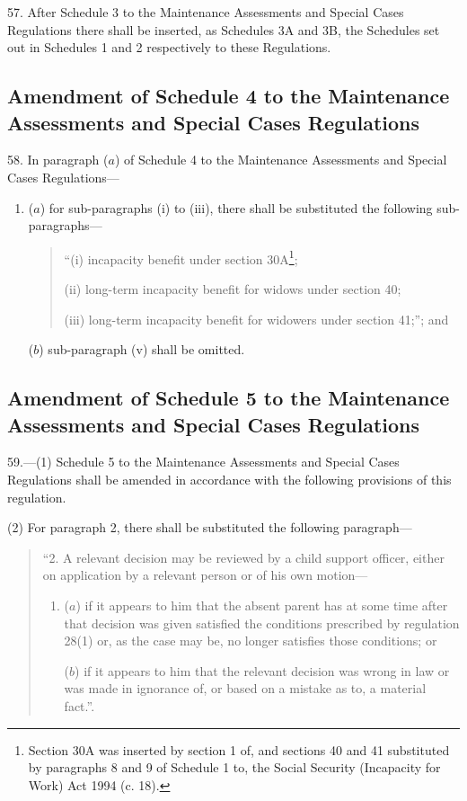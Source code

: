 \documentclass[a4paper]{article}
\begin{document}
57.  After Schedule 3 to the Maintenance Assessments and Special Cases Regulations there shall be inserted, as Schedules 3A and 3B, the Schedules set out in Schedules 1 and 2 respectively to these Regulations.

\subsection[58. Amendment of Schedule 4 to the Maintenance Assessments and Special Cases Regulations]{Amendment of Schedule 4 to the Maintenance Assessments and Special Cases Regulations}

58.  In paragraph ($a$) of Schedule 4 to the Maintenance Assessments and Special Cases Regulations—
\begin{enumerate}\item[]
($a$) for sub-paragraphs (i) to (iii), there shall be substituted the following sub-paragraphs—
\begin{quotation}
“(i) incapacity benefit under section 30A\footnote{\frenchspacing Section 30A was inserted by section 1 of, and sections 40 and 41 substituted by paragraphs 8 and 9 of Schedule 1 to, the Social Security (Incapacity for Work) Act 1994 (c. 18).};

(ii) long-term incapacity benefit for widows under section 40;

(iii) long-term incapacity benefit for widowers under section 41;”; and
\end{quotation}

($b$) sub-paragraph (v) shall be omitted.
\end{enumerate}

\subsection[59. Amendment of Schedule 5 to the Maintenance Assessments and Special Cases Regulations]{Amendment of Schedule 5 to the Maintenance Assessments and Special Cases Regulations}

59.—(1) Schedule 5 to the Maintenance Assessments and Special Cases Regulations shall be amended in accordance with the following provisions of this regulation.

(2) For paragraph 2, there shall be substituted the following paragraph—
\begin{quotation}
“2.  A relevant decision may be reviewed by a child support officer, either on application by a relevant person or of his own motion—
\begin{enumerate}\item[]
($a$) if it appears to him that the absent parent has at some time after that decision was given satisfied the conditions prescribed by regulation 28(1) or, as the case may be, no longer satisfies those conditions; or

($b$) if it appears to him that the relevant decision was wrong in law or was made in ignorance of, or based on a mistake as to, a material fact.”.
\end{enumerate}
\end{quotation}
\end{document}
